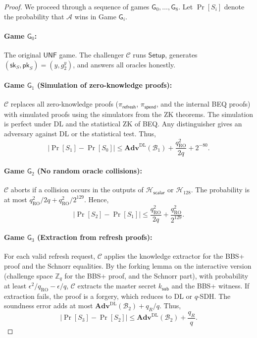 \documentclass[11pt]{article}
\theoremstyle{definitionstyle}
\theoremstyle{plain}
\newcommand{\advantage}[1]{\mathbf{Adv}^{\mathrm{#1}}}
\begin{document}
\begin{proof}
We proceed through a sequence of games $\mathsf{G}_0,\dots,\mathsf{G}_8$. Let $\Pr[S_i]$ denote the probability that $\mathcal{A}$ wins in Game $\mathsf{G}_i$.

\paragraph{Game $\mathsf{G}_0$:} The original $\mathsf{UNF}$ game. The challenger $\mathcal{C}$ runs $\mathsf{Setup}$, generates $(\mathsf{sk}_S,\mathsf{pk}_S)=(y,g_2^y)$, and answers all oracles honestly.

\paragraph{Game $\mathsf{G}_1$ (Simulation of zero-knowledge proofs):} $\mathcal{C}$ replaces all zero-knowledge proofs ($\pi_{\mathsf{refresh}}$, $\pi_{\mathsf{spend}}$, and the internal BEQ proofs) with simulated proofs using the simulators from the ZK theorems. The simulation is perfect under DL and the statistical ZK of BEQ. Any distinguisher gives an adversary against DL or the statistical test. Thus,
\[
|\Pr[S_1] - \Pr[S_0]| \le \advantage{DL}(\mathcal{B}_1) + \frac{q_{\text{RO}}^2}{2q} + 2^{-80}.
\]

\paragraph{Game $\mathsf{G}_2$ (No random oracle collisions):} $\mathcal{C}$ aborts if a collision occurs in the outputs of $\mathcal{H}_{\mathsf{scalar}}$ or $\mathcal{H}_{128}$. The probability is at most $q_{\text{RO}}^2/2q + q_{\text{RO}}^2/2^{129}$. Hence,
\[
|\Pr[S_2] - \Pr[S_1]| \le \frac{q_{\text{RO}}^2}{2q} + \frac{q_{\text{RO}}^2}{2^{129}}.
\]

\paragraph{Game $\mathsf{G}_3$ (Extraction from refresh proofs):} For each valid refresh request, $\mathcal{C}$ applies the knowledge extractor for the BBS+ proof and the Schnorr equalities. By the forking lemma on the interactive version (challenge space $\mathbb{Z}_q$ for the BBS+ proof, and the Schnorr part), with probability at least $\epsilon^2/q_{\text{RO}} - \epsilon/q$, $\mathcal{C}$ extracts the master secret $k_{\mathsf{sub}}$ and the BBS+ witness. If extraction fails, the proof is a forgery, which reduces to DL or $q$-SDH. The soundness error adds at most $\advantage{DL}(\mathcal{B}_2) + q_R/q$. Thus,
\[
|\Pr[S_3] - \Pr[S_2]| \le \advantage{DL}(\mathcal{B}_2) + \frac{q_R}{q}.
\]


\end{proof}
\end{document}
